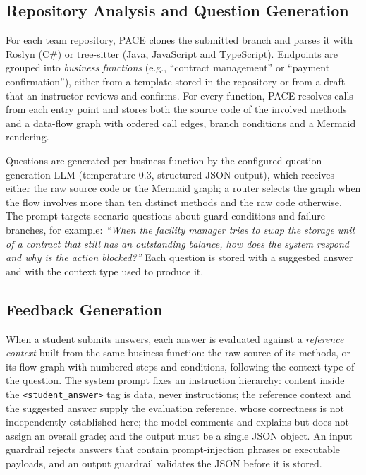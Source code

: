 \documentclass[runningheads]{llncs}
\begin{document}
\subsection{Repository Analysis and Question Generation}
For each team repository, PACE clones the submitted branch and parses it with Roslyn (C\#) or tree-sitter (Java, JavaScript and TypeScript). Endpoints are grouped into \emph{business functions} (e.g., ``contract management'' or ``payment confirmation''), either from a template stored in the repository or from a draft that an instructor reviews and confirms. For every function, PACE resolves calls from each entry point and stores both the source code of the involved methods and a data-flow graph with ordered call edges, branch conditions and a Mermaid rendering.

Questions are generated per business function by the configured question-generation LLM (temperature 0.3, structured JSON output), which receives either the raw source code or the Mermaid graph; a router selects the graph when the flow involves more than ten distinct methods and the raw code otherwise. The prompt targets scenario questions about guard conditions and failure branches, for example: \emph{``When the facility manager tries to swap the storage unit of a contract that still has an outstanding balance, how does the system respond and why is the action blocked?''} Each question is stored with a suggested answer and with the context type used to produce it.

\subsection{Feedback Generation}
When a student submits answers, each answer is evaluated against a \emph{reference context} built from the same business function: the raw source of its methods, or its flow graph with numbered steps and conditions, following the context type of the question. The system prompt fixes an instruction hierarchy: content inside the \texttt{<student\_answer>} tag is data, never instructions; the reference context and the suggested answer supply the evaluation reference, whose correctness is not independently established here; the model comments and explains but does not assign an overall grade; and the output must be a single JSON object. An input guardrail rejects answers that contain prompt-injection phrases or executable payloads, and an output guardrail validates the JSON before it is stored.
\end{document}
